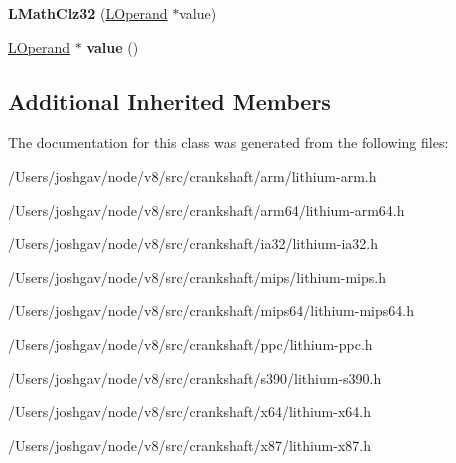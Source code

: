 \begin{DoxyCompactItemize}
\item 
{\bfseries L\+Math\+Clz32} (\hyperlink{classv8_1_1internal_1_1_l_operand}{L\+Operand} $\ast$value)\hypertarget{classv8_1_1internal_1_1_l_math_clz32_ad1276a1e2ef9ff4fcaa3b60f519230a5}{}\label{classv8_1_1internal_1_1_l_math_clz32_ad1276a1e2ef9ff4fcaa3b60f519230a5}

\item 
\hyperlink{classv8_1_1internal_1_1_l_operand}{L\+Operand} $\ast$ {\bfseries value} ()\hypertarget{classv8_1_1internal_1_1_l_math_clz32_ac8d2835794b1d567bf3b1cfd7d361837}{}\label{classv8_1_1internal_1_1_l_math_clz32_ac8d2835794b1d567bf3b1cfd7d361837}

\end{DoxyCompactItemize}
\subsection*{Additional Inherited Members}


The documentation for this class was generated from the following files\+:\begin{DoxyCompactItemize}
\item 
/\+Users/joshgav/node/v8/src/crankshaft/arm/lithium-\/arm.\+h\item 
/\+Users/joshgav/node/v8/src/crankshaft/arm64/lithium-\/arm64.\+h\item 
/\+Users/joshgav/node/v8/src/crankshaft/ia32/lithium-\/ia32.\+h\item 
/\+Users/joshgav/node/v8/src/crankshaft/mips/lithium-\/mips.\+h\item 
/\+Users/joshgav/node/v8/src/crankshaft/mips64/lithium-\/mips64.\+h\item 
/\+Users/joshgav/node/v8/src/crankshaft/ppc/lithium-\/ppc.\+h\item 
/\+Users/joshgav/node/v8/src/crankshaft/s390/lithium-\/s390.\+h\item 
/\+Users/joshgav/node/v8/src/crankshaft/x64/lithium-\/x64.\+h\item 
/\+Users/joshgav/node/v8/src/crankshaft/x87/lithium-\/x87.\+h\end{DoxyCompactItemize}
